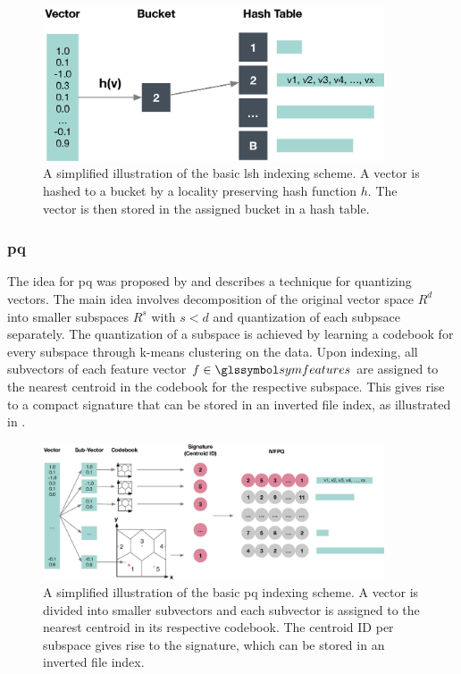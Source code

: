 \begin{figure}[bt]
    \centering
    \includegraphics[width=0.9\textwidth]{figures/lsh}
    \caption{A simplified illustration of the basic \acrshort{lsh} indexing scheme. A vector is hashed to a bucket by a locality preserving hash function $h$. The vector is then stored in the assigned bucket in a hash table.}
    \label{fig:lsh}
\end{figure}

\subsubsection{\acrfull{pq}}

The idea for \acrshort{pq} was proposed by \cite{Jegou:2010Product} and describes a technique for quantizing vectors. The main idea involves decomposition of the original vector space $R^d$ into smaller subspaces $R^s$ with $s < d$ and quantization of each subpsace separately. The quantization of a subspace is achieved by learning a codebook for every subspace through k-means clustering on the data. Upon indexing, all subvectors of each feature vector $f \in \symfeatures$ are assigned to the nearest centroid in the codebook for the respective subspace. This gives rise to a compact signature that can be stored in an inverted file index, as illustrated in .

\begin{figure}[bt]
    \centering
    \includegraphics[width=0.9\textwidth]{figures/pq}
    \caption{A simplified illustration of the basic \acrshort{pq} indexing scheme. A vector is divided into smaller subvectors and each subvector is assigned to the nearest centroid in its respective codebook. The centroid ID per subspace gives rise to the signature, which can be stored in an inverted file index.}
    \label{fig:pq}
\end{figure}

